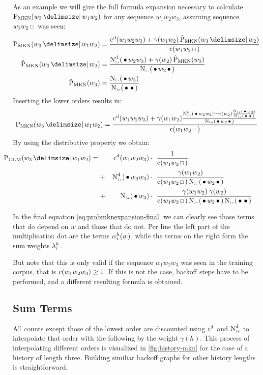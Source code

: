 As an example we will give the full formula expansion necessary to calculate
$\ProbMKN{w_3}{w_1 w_2}$ for any sequence $w_1 w_2 w_3$, assuming sequence
$w_1 w_2 \Skp$ was seen:
\begin{subequations}
  \begin{align}
    \ProbMKN {w_3}{w_1 w_2} &= \ProbMKNcab{\ProbMKN*{w_3}{w_2}} \\
    \ProbMKN*{w_3}{w_2}     &= \ProbMKNcb{\ProbMKN*{w_3}} \\
    \ProbMKN*{w_3}          &= \ProbMKNc
  \end{align}
\end{subequations}
Inserting the lower orders results in:
\begin{equation}
  \ProbMKN {w_3}{w_1 w_2} = \ProbMKNcab{\ProbMKNcb{\ProbMKNc}}
\end{equation}
By using the distributive property we obtain:
\begin{align}
  \label{eq:probmknexpansion-final}
  \hspace{-2.5em}\ProbGLM {w_3}{w_1 w_2} = {}
    & & \DiscountedCount (w_1 w_2 w_3)   & \cdot\ \frac{1}{\Count(w_1 w_2 \Skp)} \\
    &+& \DiscountedCount*(\WSkp w_3 w_3) & \cdot\ \frac{\gamma(w_1 w_2)}{\Count(w_1 w_2 \Skp) \ContCountIp(\WSkp w_2 \WSkp)} \nonumber \\
    &+& \ContCountIp(\WSkp w_3)          & \cdot\ \frac{\gamma(w_1 w_2) \: \gamma(w_2)}{\Count(w_1 w_2 \Skp) \ContCountIp(\WSkp w_2 \WSkp) \ContCountIp(\WSkp \WSkp)} \nonumber
\end{align}

In the final equation \cref{eq:probmknexpansion-final} we can clearly see
those terms that do depend on $w$ and those that do not.
Per line the left part of the multiplication dot are the terms $\alpha^h_i(w)$,
while the terms on the right form the sum weights $\lambda^h_i$.

But note that this is only valid if the sequence $w_1 w_2 w_3$ was seen in
the training corpus, that is $\operatorname{c}(w_1 w_2 w_3) \geq 1$.
If this is not the case, backoff steps have to be performed, and a different
resulting formula is obtained.

\subsection{Sum Terms}

All counts except those of the lowest order are discounted using
$\DiscountedCount$ and $\DiscountedCount*$ to interpolate that order with the
following by the weight $\gamma(h)$.
This process of interpolating different orders is visualized in
\cref{fig:history-mkn} for the case of a history of length three.
Building similiar backoff graphs for other history lengths is straightforward.

